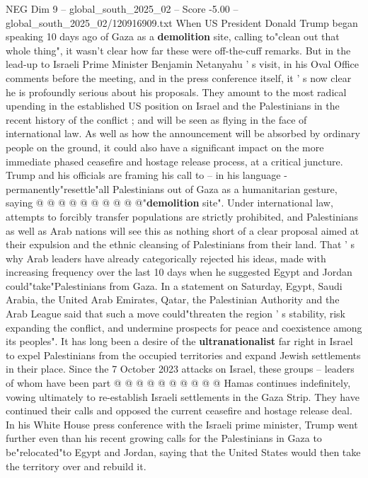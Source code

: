 \begin{textsample}{NEG Dim 9 – global\_south\_2025\_02 – Score -5.00 – global\_south\_2025\_02/120916909.txt}  \label{ex:f9_neg_057}
When US President Donald Trump began speaking 10 days ago of Gaza as a \textbf{demolition} site, calling to"clean out that whole thing", it wasn't clear how far these were off-the-cuff remarks.
But in the lead-up to Israeli Prime Minister Benjamin Netanyahu ' s visit, in his Oval Office comments before the meeting, and in the press conference itself, it ' s now clear he is profoundly serious about his proposals.
They amount to the most radical upending in the established US position on Israel and the Palestinians in the recent history of the conflict ; and will be seen as flying in the face of international law.
As well as how the announcement will be absorbed by ordinary people on the ground, it could also have a significant impact on the more immediate phased ceasefire and hostage release process, at a critical juncture.
Trump and his officials are framing his call to -- in his language - permanently"resettle"all Palestinians out of Gaza as a humanitarian gesture, saying @ @ @ @ @ @ @ @ @ @"\textbf{demolition} site".
Under international law, attempts to forcibly transfer populations are strictly prohibited, and Palestinians as well as Arab nations will see this as nothing short of a clear proposal aimed at their expulsion and the ethnic cleansing of Palestinians from their land.
That ' s why Arab leaders have already categorically rejected his ideas, made with increasing frequency over the last 10 days when he suggested Egypt and Jordan could"take"Palestinians from Gaza.
In a statement on Saturday, Egypt, Saudi Arabia, the United Arab Emirates, Qatar, the Palestinian Authority and the Arab League said that such a move could"threaten the region ' s stability, risk expanding the conflict, and undermine prospects for peace and coexistence among its peoples".
It has long been a desire of the \textbf{ultranationalist} far right in Israel to expel Palestinians from the occupied territories and expand Jewish settlements in their place.
Since the 7 October 2023 attacks on Israel, these groups -- leaders of whom have been part @ @ @ @ @ @ @ @ @ @ Hamas continues indefinitely, vowing ultimately to re-establish Israeli settlements in the Gaza Strip.
They have continued their calls and opposed the current ceasefire and hostage release deal.
In his White House press conference with the Israeli prime minister, Trump went further even than his recent growing calls for the Palestinians in Gaza to be"relocated"to Egypt and Jordan, saying that the United States would then take the territory over and rebuild it.

\end{textsample}
